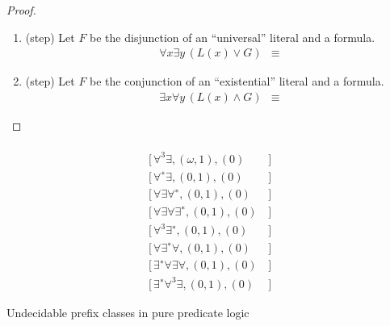 \begin{proof}
\begin{enumerate}
		
		\item (step)
		Let $F$ be the disjunction of an “universal” literal and a formula.	
		\begin{align*}
		\forall x \exists y\,(L(x)\lor G) 
		&\equiv 
		\end{align*}
		
		\item (step)
		Let $F$ be the conjunction of an “existential” literal and a formula.
		\begin{align*}
		\exists x \forall y\,(L(x)\land G) 
		&\equiv 
		\end{align*}
		
		
	\end{enumerate}
\end{proof}



%
%		



\begin{table}[hbt]
	\begin{align*}
	[\,\forall\exists\forall, (\omega, 1), (0)&\,] \tag{Kahr 1962}
	\\
	[\,\forall^3 \exists, (\omega, 1), (0)&\,] \tag{Surányi 1959}
	\\
	[\,\forall^{∗} \exists, (0, 1), (0)&\,] \tag{Kalmár-Surányi 1950}
	\\
	[\,\forall\exists\forall^{∗} , (0, 1), (0)&\,]  \tag{Denton 1960}
	\\
	[\,\forall\exists\forall\exists^{∗}, (0, 1), (0)&\,] \tag{Gurevich 1966}
	\\
	[\,\forall^3 \exists^{∗} , (0, 1), (0)&\,] \tag{Kalmár-Surányi 1947}
	\\
	[\,\forall\exists^{∗} \forall, (0, 1), (0)&\,] \tag{Kostyrko-Genenz 1964}
	\\
	[\,\exists^{∗} \forall\exists\forall, (0, 1), (0)&\,] \tag{Surányi 1959}
	\\
	[\,\exists^{∗} \forall^3 \exists, (0, 1), (0)&\,] \tag{Surányi 1959}
	\end{align*}
	\caption{Undecidable prefix classes in pure predicate logic}
	\label{tab:undecidable:PurePredicateLogic}
\end{table}

